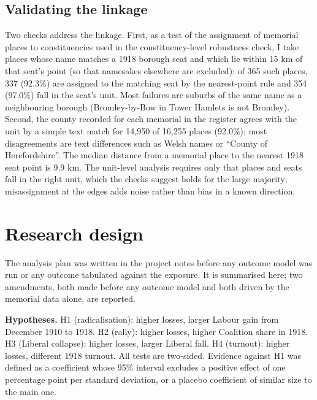 \documentclass[11pt,a4paper]{article}
\begin{document}
\subsection{Validating the linkage}
Two checks address the linkage. First, as a test of the assignment of memorial places to constituencies used in the constituency-level robustness check, I take places whose name matches a 1918 borough seat and which lie within 15 km of that seat's point (so that namesakes elsewhere are excluded): of 365 such places, 337 (92.3\%) are assigned to the matching seat by the nearest-point rule and 354 (97.0\%) fall in the seat's unit. Most failures are suburbs of the same name as a neighbouring borough (Bromley-by-Bow in Tower Hamlets is not Bromley). Second, the county recorded for each memorial in the register agrees with the unit by a simple text match for 14,950 of 16,255 places (92.0\%); most disagreements are text differences such as Welsh names or ``County of Herefordshire''. The median distance from a memorial place to the nearest 1918 seat point is 9.9 km. The unit-level analysis requires only that places and seats fall in the right unit, which the checks suggest holds for the large majority; misassignment at the edges adds noise rather than bias in a known direction.

\section{Research design}\label{sec:design}
The analysis plan was written in the project notes before any outcome model was run or any outcome tabulated against the exposure. It is summarised here; two amendments, both made before any outcome model and both driven by the memorial data alone, are reported.

\textbf{Hypotheses.} H1 (radicalisation): higher losses, larger Labour gain from December 1910 to 1918. H2 (rally): higher losses, higher Coalition share in 1918. H3 (Liberal collapse): higher losses, larger Liberal fall. H4 (turnout): higher losses, different 1918 turnout. All tests are two-sided. Evidence against H1 was defined as a coefficient whose 95\% interval excludes a positive effect of one percentage point per standard deviation, or a placebo coefficient of similar size to the main one.
\end{document}

